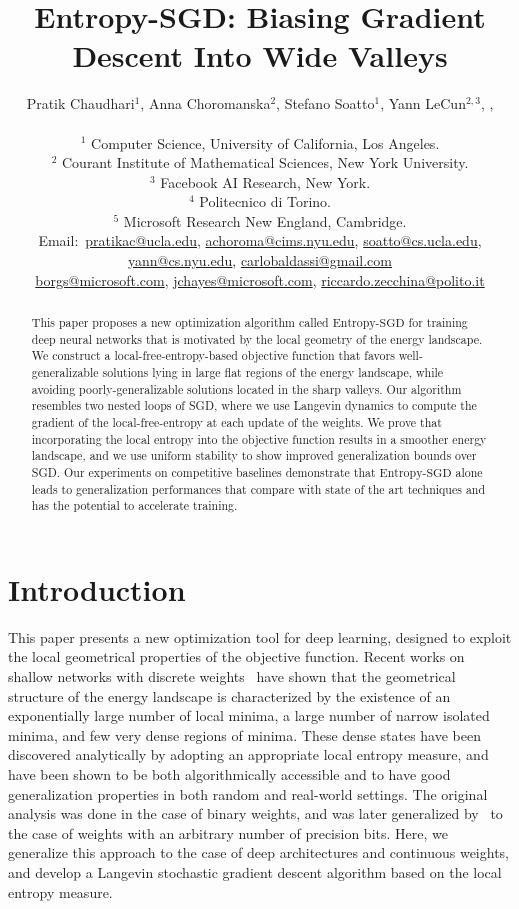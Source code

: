 \documentclass[10pt]{article}
\title{Entropy-SGD: Biasing Gradient Descent Into Wide Valleys}
\author{Pratik Chaudhari$^{1}$, Anna Choromanska$^{2}$, Stefano Soatto$^{1}$, Yann LeCun$^{2,3}$, \red{Carlo Baldassi$^{4}$},\\[0.03in]
\red{\textbf{Christian Borgs$^{5}$, Jennifer Chayes$^{5}$, 
Riccardo Zecchina$^{4}$}}\\[0.05in]
$^{1}$ Computer Science, University of California, Los Angeles.\\
$^{2}$ Courant Institute of Mathematical Sciences, New York University.\\
$^{3}$ Facebook AI Research, New York.\\
$^{4}$ Politecnico di Torino.\\
$^{5}$ Microsoft Research New England, Cambridge.\\ [0.05in]
{\footnotesize
Email:\ \href{mailto:pratikac@ucla.edu}{pratikac@ucla.edu},
\href{mailto:achoroma@cims.nyu.edu}{achoroma@cims.nyu.edu},
\href{mailto:soatto@cs.ucla.edu}{soatto@cs.ucla.edu},
\href{mailto:yann@cs.nyu.edu}{yann@cs.nyu.edu},
\href{mailto:carlobaldassi@gmail.com}{carlobaldassi@gmail.com}}\\[0.03in]
{\footnotesize
\hspace{0.33in} \href{mailto:borgs@microsoft.com}{borgs@microsoft.com},
\href{mailto:jchayes@microsoft.com}{jchayes@microsoft.com},
\red{\href{mailto:leventsagun@gmail.com}{leventsagun@gmail.com},}
\href{mailto:riccardo.zecchina@polito.it}{riccardo.zecchina@polito.it}
}}
\newcommand\red[1]{{\color{red}#1}}
\newcommand{\entropysgd}{\mathrm{Entropy}\textrm{-}\mathrm{SGD}}
\newcommand{\pc}[2]{{\color{ForestGreen}#1}\marginpar{\tiny\noindent{\raggedright{\color{Sienna}[PC]}\color{Sienna}{#2} \par}}}
\begin{document}
\maketitle

\begin{abstract}
This paper proposes a new optimization algorithm called $\entropysgd$ for training deep neural networks that is motivated by the local geometry of the energy landscape. We construct a local-{\color{red}free-}entropy-based objective function that favors well-generalizable solutions lying in large flat regions of the energy landscape, while avoiding poorly-generalizable solutions located in the sharp valleys. Our algorithm resembles two nested loops of SGD, where we use Langevin dynamics to compute the gradient of the local-{\color{red}free-}entropy at each update of the weights. We prove that incorporating the local entropy into the objective function results in a smoother energy landscape, and we use uniform stability to show improved generalization bounds over SGD. Our experiments on competitive baselines demonstrate that $\entropysgd$ alone leads to generalization performances that compare with state of the art techniques and has the potential to accelerate training.
\pc{}{We also perform a direct comparison between the information provided by the local entropy measure and the analysis of the Hessian in qualitatively different minima.}
\end{abstract}

\section{Introduction}
\label{s:intro}
This paper presents a new optimization tool for deep learning, designed to exploit the local geometrical properties of the objective function. \red{Recent works on shallow networks with discrete weights~\citep{baldassi2015subdominant,baldassi2016unreasonable} have shown that the geometrical structure of the energy landscape is characterized by the existence of an exponentially large number of local minima, a large number of narrow isolated minima, and few very dense regions of minima. These dense states have been discovered analytically by adopting an appropriate local entropy measure, and have been shown to be both algorithmically accessible and to have good generalization properties in both random and real-world settings. The original analysis was done in the case of binary weights, and was later generalized by~\citet{baldassi2016multilevel} to the case of weights with an arbitrary number of precision bits. Here, we generalize this approach to the case of deep architectures and continuous weights, and develop a Langevin stochastic gradient descent algorithm based on the local entropy measure.}
\end{document}
